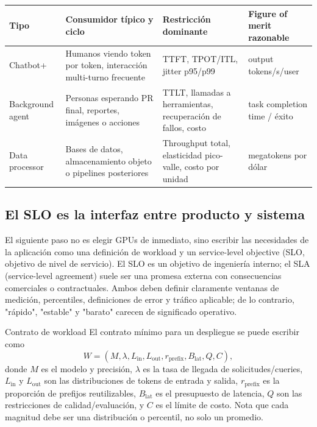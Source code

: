 \begin{center}
\small
\begin{tabularx}{\textwidth}{L{2.5cm}YYY}
\toprule
Tipo & Consumidor típico y ciclo & Restricción dominante & Figure of merit razonable \\
\midrule
Chatbot+ & Humanos viendo token por token, interacción multi-turno frecuente & TTFT, TPOT/ITL, jitter p95/p99 & output tokens/s/user \\
Background agent & Personas esperando PR final, reportes, imágenes o acciones & TTLT, llamadas a herramientas, recuperación de fallos, costo & task completion time / éxito \\
Data processor & Bases de datos, almacenamiento objeto o pipelines posteriores & Throughput total, elasticidad pico-valle, costo por unidad & megatokens por dólar \\
\bottomrule
\end{tabularx}
\end{center}


\subsection{El SLO es la interfaz entre producto y sistema}

El siguiente paso no es elegir GPUs de inmediato, sino escribir las necesidades de la aplicación como una definición de workload y un service-level objective (SLO, objetivo de nivel de servicio). El SLO es un objetivo de ingeniería interno; el SLA (service-level agreement) suele ser una promesa externa con consecuencias comerciales o contractuales. Ambos deben definir claramente ventanas de medición, percentiles, definiciones de error y tráfico aplicable; de lo contrario, "rápido", "estable" y "barato" carecen de significado operativo.


\begin{importantbox}{Contrato de workload}
El contrato mínimo para un despliegue se puede escribir como
\[
W=(M,\lambda,L_{\mathrm{in}},L_{\mathrm{out}},r_{\mathrm{prefix}},B_{\mathrm{lat}},Q,C),
\]
donde $M$ es el modelo y precisión, $\lambda$ es la tasa de llegada de solicitudes/cueries, $L_{\mathrm{in}}$ y $L_{\mathrm{out}}$ son las distribuciones de tokens de entrada y salida, $r_{\mathrm{prefix}}$ es la proporción de prefijos reutilizables, $B_{\mathrm{lat}}$ es el presupuesto de latencia, $Q$ son las restricciones de calidad/evaluación, y $C$ es el límite de costo. Nota que cada magnitud debe ser una distribución o percentil, no solo un promedio.
\end{importantbox}

